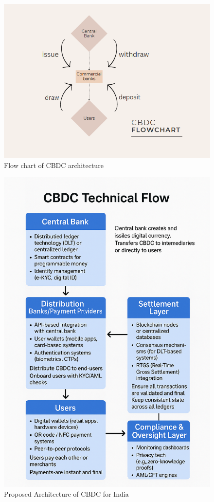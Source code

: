 \begin{figure}
    \centering
    \includegraphics[width=0.8\linewidth]{image.png}
    \caption{Flow chart of CBDC architecture}
    \label{fig:enter-label}
\end{figure}
\begin{figure}
    \centering
    \includegraphics[width=0.8\linewidth]{image2.png}
    \caption{Proposed Architecture of CBDC for India}
    \label{fig:cbdc_architecture}
\end{figure}

